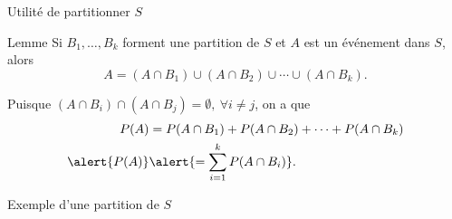 \documentclass{BeamerTemplate}
\begin{document}
\begin{frame}[t]{Utilité de partitionner $S$}
 \begin{Boite}{Lemme}
  Si $B_1,\ldots,B_k$ forment une partition de $S$ et
  $A$ est un événement dans $S$, alors
  $$A=(A\cap B_1)\cup(A\cap B_2)\cup\cdots\cup(A\cap B_k).$$

  Puisque $(A\cap B_i)\cap(A\cap B_j)=\emptyset,\ \forall i\neq j$, on a que
  \begin{align*}
  P(A)&=P(A\cap B_1)+P(A\cap B_2)+\cdots+P(A\cap B_k)\\
  \alert {P(A)} &\alert{=\sum_{i=1}^kP(A\cap B_i)}.
  \end{align*}
 \end{Boite}
\end{frame}

\begin{frame}[t]{Exemple d'une partition de $S$}

\begin{center}
\end{center}
\end{frame}
\end{document}

